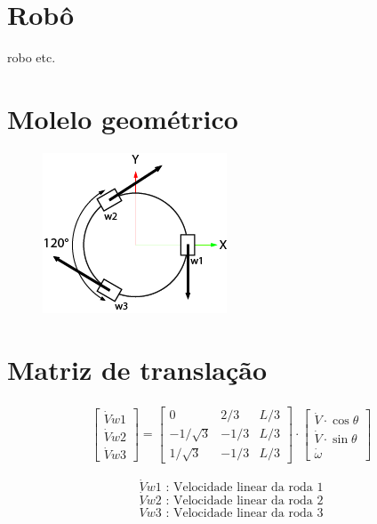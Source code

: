 
\section{Robô}
robo etc.

\section{Molelo geométrico}

\begin{figure}[h]
	\centering
	\includegraphics{figures/model}
\end{figure}

\section{Matriz de translação}

\begin{gather}
	\begin{bmatrix} \dot{V}{w1} \\  \dot{V}{w2} \\  \dot{V}{w3} \end{bmatrix}
	=
	\begin{bmatrix}
		0 & 2/3 & L/3 \\
		-1/\sqrt{3} & -1/3 & L/3\\
		1/\sqrt{3} & -1/3 & L/3
	\end{bmatrix}
	\cdot
	\begin{bmatrix} \dot{V}\cdot \cos{\theta} \\  \dot{V}\cdot \sin{\theta} \\  \dot{\omega} \end{bmatrix}
   \end{gather}


   \[\dot{V}{w1}   \text{ :  Velocidade linear da roda 1} \]  
   \[\dot{V}{w2}   \text{ :  Velocidade linear da roda 2} \]  
   \[\dot{V}{w3}   \text{ :  Velocidade linear da roda 3} \]  


